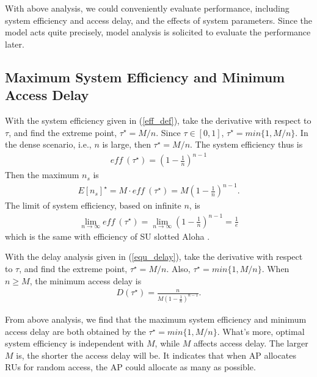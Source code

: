 \documentclass[journal]{IEEEtran}
\begin{document}
With above analysis, we could conveniently evaluate performance, including system efficiency and access delay, and the effects of system parameters.
Since the model acts quite precisely, model analysis is solicited to evaluate the performance later.

\subsection{Maximum System Efficiency and Minimum Access Delay} 	\label{sec_max_min}
With the system efficiency given in (\ref{eff_def}), take the derivative with respect to $\tau$, and find the extreme point, $\tau^\star = M/n$. Since $\tau\in [0,1]$, $\tau^\star = min\lbrace 1,M/n\rbrace$. 
In the dense scenario, i.e., $n$ is large, then $\tau^\star = M/n$. 
The system efficiency thus is
\begin{align}
\textit{eff}\ (\tau^\star) = (1-\frac{1}{n})^{n-1} 
\label{equ_max_eff}
\end{align}
Then the maximum $n_s$ is 
\begin{align}
\label{equ_max_ns}
E[n_s]^\star = M \cdot \textit{eff}\ (\tau^\star) = M(1-\frac{1}{n})^{n-1} .
\end{align}
The limit of system efficiency, based on infinite $n$, is
\begin{align}
\label{eff_limit}
\lim_{n\rightarrow \infty}\textit{eff}\ (\tau^\star) = \lim_{n\rightarrow \infty}(1-\frac{1}{n})^{n-1} =\frac{1}{e} 
\end{align}
which is the same with efficiency of SU slotted Aloha \cite{roberts1975aloha}.



With the delay analysis given in (\ref{equ_delay}), take the derivative with respect to $\tau$, and find the extreme point, $\tau^\star = M/n$. Also, $\tau^\star = min\lbrace 1, M/n\rbrace$. 
When $n\geq M$, the minimum access delay is  
\begin{align}
\label{equ_min_delay}
D(\tau^\star) = \frac{n}{M(1-\frac{1}{n})^{n-1}}.
\end{align}

From above analysis, we find that the maximum system efficiency and minimum access delay are both obtained by the $\tau^\star = min\lbrace 1, M/n\rbrace$.
What's more, optimal system efficiency is independent with $M$, while $M$ affects access delay. 
The larger $M$ is, the shorter the access delay will be. 
It indicates that when AP allocates RUs for random access, the AP could allocate as many as possible.
\end{document}
